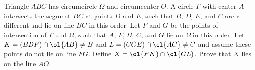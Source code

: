 Triangle $ABC$ has circumcircle $\Omega$ and circumcenter $O$.
A circle $\Gamma$ with center $A$
intersects the segment $BC$ at points $D$ and $E$,
such that $B$, $D$, $E$, and $C$ are all different
and lie on line $BC$ in this order.
Let $F$ and $G$ be the points of intersection of $\Gamma$ and $\Omega$,
such that $A$, $F$, $B$, $C$, and $G$ lie on $\Omega$ in this order.
Let $K = (BDF) \cap \ol{AB} \neq B$
and $L = (CGE) \cap \ol{AC} \neq C$
and assume these points do not lie on line $FG$.
Define $X = \ol{FK} \cap \ol{GL}$.
Prove that $X$ lies on the line $AO$.